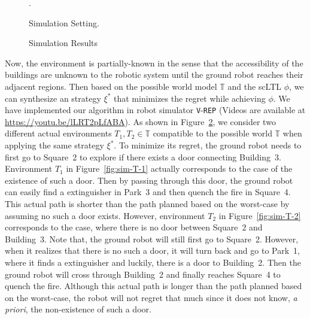 \documentclass{ifacconf}
\def\ZJN#1{{\textcolor{blue}{#1}}}
\def \T{\mathbb{T}}
\begin{document}
\begin{figure} 
\centering
{}
\subfigure[Possible World $\T$.]{
\label{fig:sim-poss}
}.\vspace{-12pt}
\caption{Simulation Setting.}\label{fig:simulation-setting}
\end{figure} 


\begin{figure} 
\centering
{}
\vspace{-12pt}
\caption{Simulation Results}\label{fig:simulation-results}
\end{figure} 


Now, the environment is partially-known in the sense that the accessibility of the buildings are unknown to the robotic system until the ground robot reaches their adjacent regions. Then based   on the possible world model $\T$ and the scLTL $\phi$, we can synthesize an strategy $\xi^*$ that minimizes the regret while achieving $\phi$. We have implemented our algorithm in  robot simulator \texttt{V}-\texttt{REP} (Videos are available at  \ZJN{\url{https://youtu.be/lLRT2pLfABA}}). 
As shown in Figure~\ref{fig:simulation-results}, we consider two different actual environments $T_1,T_2  \!\in\!\T$ compatible to the possible world $\T$ when applying the same strategy $\xi^*$.  
To minimize its regret, the ground robot needs to first go to Square~2 to explore if there exists a door connecting Building~3. Environment $T_1$  in Figure~\ref{fig:sim-T-1} actually corresponds to the case of the existence of such a door. Then by passing through this door, the ground robot can easily find a \textsf{extinguisher} in Park~3 and then quench the \textsf{fire} in Square~4. This actual path is shorter than the path planned based on the worst-case by  assuming  no such a door exists.  
However, environment $T_2$ in Figure~\ref{fig:sim-T-2} corresponds to the case, where there is no door between Square~2 and Building~3. Note that, the ground robot will still first go to Square~2. However, when it realizes that there is no such a door, it will turn back and go to Park~1, where it finds a \textsf{extinguisher} and luckily, there is a door to Building~2. Then the ground robot will cross through Building~2 and finally reaches Square~4 to quench the \textsf{fire}.    
Although this actual path is longer than the path planned based on the worst-case, the robot will not regret that much since it does not know, \emph{a priori}, the non-existence of such a door. 
\end{document}
